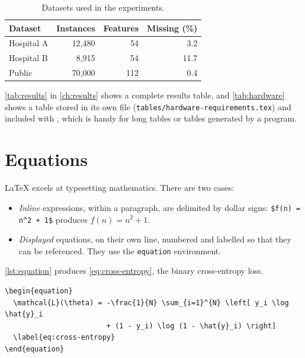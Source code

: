\begin{table}[htbp]
  \centering
  \caption{Datasets used in the experiments.}
  \label{tab:example}
  \begin{tabular}{@{}l r r r@{}}
    \toprule
    \textbf{Dataset} & \textbf{Instances} & \textbf{Features} & \textbf{Missing (\%)} \\
    \midrule
    Hospital A & 12,480 & 54  & 3.2  \\
    Hospital B &  8,915 & 54  & 11.7 \\
    Public     & 70,000 & 112 & 0.4  \\
    \bottomrule
  \end{tabular}
\end{table}

\autoref{tab:results} in \autoref{ch:results} shows a complete results table, and
\autoref{tab:hardware} shows a table stored in its own file
(\texttt{tables/hardware-requirements.tex}) and included with \verb||, which is handy
for long tables or tables generated by a program.

\section{Equations}\label{sec:equations}

\LaTeX{} excels at typesetting mathematics. There are two cases:

\begin{itemize}
  \item \emph{Inline} expressions, within a paragraph, are delimited by dollar signs:
        \texttt{\$f(n) = n\textasciicircum 2 + 1\$} produces $f(n) = n^2 + 1$.
  \item \emph{Displayed} equations, on their own line, numbered and labelled so that they
        can be referenced. They use the \texttt{equation} environment.
\end{itemize}

\autoref{lst:equation} produces \autoref{eq:cross-entropy}, the binary cross-entropy loss.

\begin{lstlisting}[language={[LaTeX]TeX}, caption={A displayed equation.}, label=lst:equation]
\begin{equation}
  \mathcal{L}(\theta) = -\frac{1}{N} \sum_{i=1}^{N} \left[ y_i \log \hat{y}_i
                        + (1 - y_i) \log (1 - \hat{y}_i) \right]
  \label{eq:cross-entropy}
\end{equation}
\end{lstlisting}

